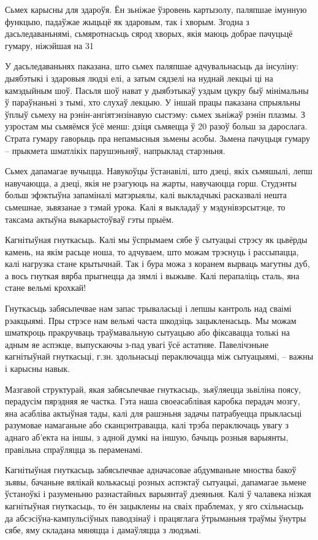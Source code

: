 Сьмех карысны для здароўя. Ён зьніжае ўзровень картызолу, паляпшае імунную функцыю, падаўжае жыцьцё як здаровым, так і хворым. Згодна з дасьледаваньнямі, сьмяротнасьць сярод хворых, якія маюць добрае пачуцьцё гумару, ніжэйшая на 31%

У дасьледаваньнях паказана, што сьмех паляпшае адчувальнасьць да інсуліну: дыябэтыкі і здаровыя людзі елі, а затым сядзелі на нуднай лекцыі ці на камэдыйным шоў. Пасьля шоў нават у дыябэтыкаў уздым цукру быў мінімальны ў параўнаньні з тымі, хто слухаў лекцыю. У іншай працы паказана спрыяльны ўплыў сьмеху на рэнін-ангіятэнзінавую сыстэму: сьмех зьніжаў рэнін плазмы. З узростам мы сьмяёмся ўсё менш: дзіця сьмяецца ў 20 разоў больш за дарослага. Страта гумару гаворыць пра непамысныя зьмены асобы. Зьмена пачуцьця гумару – прыкмета шматлікіх парушэньняў, напрыклад старэньня. 

Сьмех дапамагае вучыцца. Навукоўцы ўстанавілі, што дзеці, якіх сьмяшылі, лепш навучаюцца, а дзеці, якія не рэагуюць на жарты, навучаюцца горш. Студэнты больш эфэктыўна запаміналі матэрыялы, калі выкладчыкі расказвалі нешта сьмешнае, зьвязанае з тэмай урока. Калі я выкладаў у мэдунівэрсытэце, то таксама актыўна выкарыстоўваў гэты прыём.

Кагнітыўная гнуткасьць. Калі мы ўспрымаем сябе ў сытуацыі стрэсу як цьвёрды камень, на якім расьце ноша, то адчуваем, што можам трэснуць і рассыпацца, калі нагрузка стане крытычнай. Так і бура можа з коранем вырваць магутны дуб, а вось гнуткая вярба прыгнецца да зямлі і выжыве. Калі перапаліць сталь, яна стане вельмі крохкай!

Гнуткасьць забясьпечвае нам запас трываласьці і лепшы кантроль над сваімі рэакцыямі. Пры стрэсе нам вельмі часта шкодзіць зацыкленасьць. Мы можам шматкроць пракручваць траўмавальную сытуацыю або фіксавацца толькі на адным яе аспэкце, выпускаючы з-пад увагі ўсё астатняе. Павелічэньне кагнітыўнай гнуткасьці, г.зн. здольнасьці пераключацца між сытуацыямі, – важны і карысны навык. 

Мазгавой структурай, якая забясьпечвае гнуткасьць, зьяўляецца зьвіліна поясу, перадусім пярэдняя яе частка. Гэта наша своеасаблівая каробка перадач мозгу, яна асабліва актыўная тады, калі для рашэньня задачы патрабуецца прыкласьці разумовае намаганьне або сканцэнтравацца, калі трэба пераключаць увагу з аднаго аб'екта на іншы, з адной думкі на іншую, бачыць розныя варыянты, правільна спраўляцца зь пераменамі.

Кагнітыўная гнуткасьць забясьпечвае адначасовае абдумваньне мноства бакоў зьявы, бачаньне вялікай колькасьці розных аспэктаў сытуацыі, дапамагае зьмене ўстаноўкі і разуменьню разнастайных варыянтаў дзеяньня. Калі ў чалавека нізкая кагнітыўная гнуткасьць, то ён зацыклены на сваіх праблемах, у яго схільнасьць да абсэсіўна-кампульсіўных паводзінаў і працяглага ўтрыманьня траўмы ўнутры сябе, яму складана мяняцца і дамаўляцца з людзьмі.

